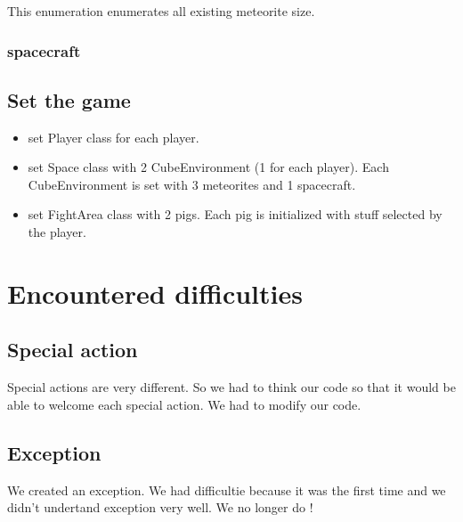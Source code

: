 This enumeration enumerates all existing meteorite size.

\subsubsection{spacecraft}


\subsection{Set the game}

\begin{itemize}
 \item set Player class for each player.
 \item set Space class with 2 CubeEnvironment (1 for each player). Each CubeEnvironment is set with 3 meteorites and 1 spacecraft.
 \item set FightArea class with 2 pigs. Each pig is initialized with stuff selected by the player.
\end{itemize}


\section{Encountered difficulties}

\subsection{Special action}

Special actions are very different. So we had to think our code so that it would be able to welcome each special action.
We had to modify our code.

\subsection{Exception}

We created an exception. We had difficultie because it was the first time and we didn't undertand exception very well.
We no longer do !


